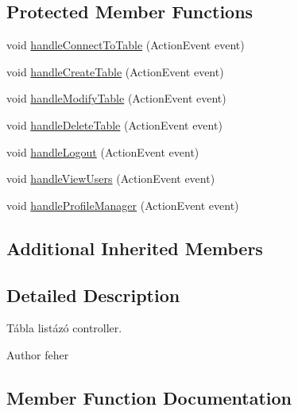 \subsection*{Protected Member Functions}
\begin{DoxyCompactItemize}
\item 
void \hyperlink{classhu_1_1elte_1_1bfw1p6_1_1poker_1_1client_1_1controller_1_1_table_lister_controller_a60d184c1e2741dbf2014aab2bbc7cfda}{handle\+Connect\+To\+Table} (Action\+Event event)
\item 
void \hyperlink{classhu_1_1elte_1_1bfw1p6_1_1poker_1_1client_1_1controller_1_1_table_lister_controller_a8971f19c1fc873d6baea588b7e9ee358}{handle\+Create\+Table} (Action\+Event event)
\item 
void \hyperlink{classhu_1_1elte_1_1bfw1p6_1_1poker_1_1client_1_1controller_1_1_table_lister_controller_a74e08f102c556bf8746e24b8c57ab29a}{handle\+Modify\+Table} (Action\+Event event)
\item 
void \hyperlink{classhu_1_1elte_1_1bfw1p6_1_1poker_1_1client_1_1controller_1_1_table_lister_controller_aa285f37176088b5211e576b567ce0711}{handle\+Delete\+Table} (Action\+Event event)
\item 
void \hyperlink{classhu_1_1elte_1_1bfw1p6_1_1poker_1_1client_1_1controller_1_1_table_lister_controller_a3daead00d29802bd86ecff8f9e937ace}{handle\+Logout} (Action\+Event event)
\item 
void \hyperlink{classhu_1_1elte_1_1bfw1p6_1_1poker_1_1client_1_1controller_1_1_table_lister_controller_a0ee1af14895cd5fa7dd7af5a42dcad2a}{handle\+View\+Users} (Action\+Event event)
\item 
void \hyperlink{classhu_1_1elte_1_1bfw1p6_1_1poker_1_1client_1_1controller_1_1_table_lister_controller_a03e819a8dde6b126d6ecb37d13a232d5}{handle\+Profile\+Manager} (Action\+Event event)
\end{DoxyCompactItemize}
\subsection*{Additional Inherited Members}


\subsection{Detailed Description}
Tábla listázó controller. \begin{DoxyAuthor}{Author}
feher 
\end{DoxyAuthor}


\subsection{Member Function Documentation}
\hypertarget{classhu_1_1elte_1_1bfw1p6_1_1poker_1_1client_1_1controller_1_1_table_lister_controller_a60d184c1e2741dbf2014aab2bbc7cfda}{}
